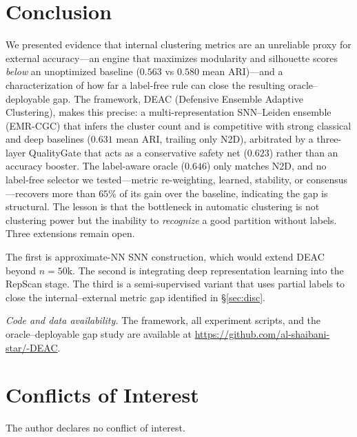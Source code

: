 \documentclass[journal]{IEEEtran}
\begin{document}
\section{Conclusion}\label{sec:conc}

We presented evidence that internal clustering metrics are an unreliable proxy for external accuracy---an engine that maximizes modularity and silhouette scores \emph{below} an unoptimized baseline ($0.563$ vs $0.580$ mean ARI)---and a characterization of how far a label-free rule can close the resulting oracle--deployable gap. The framework, DEAC (Defensive Ensemble Adaptive Clustering), makes this precise: a multi-representation SNN--Leiden ensemble (EMR-CGC) that infers the cluster count and is competitive with strong classical and deep baselines ($0.631$ mean ARI, trailing only N2D), arbitrated by a three-layer QualityGate that acts as a conservative safety net ($0.623$) rather than an accuracy booster. The label-aware oracle ($0.646$) only matches N2D, and no label-free selector we tested---metric re-weighting, learned, stability, or consensus---recovers more than $65\%$ of its gain over the baseline, indicating the gap is structural. The lesson is that the bottleneck in automatic clustering is not clustering power but the inability to \emph{recognize} a good partition without labels. Three extensions remain open.

The first is approximate-NN SNN construction, which would extend DEAC beyond $n{=}50$k. The second is integrating deep representation learning into the RepScan stage. The third is a semi-supervised variant that uses partial labels to close the internal--external metric gap identified in \S\ref{sec:disc}.

\vspace{2pt}
\noindent\textit{Code and data availability.} The framework, all experiment scripts, and the oracle--deployable gap study are available at \url{https://github.com/al-shaibani-star/-DEAC}.

\section*{Conflicts of Interest}
\noindent The author declares no conflict of interest.
\end{document}
